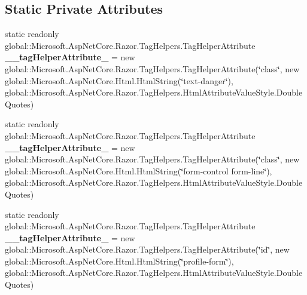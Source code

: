 \subsection*{Static Private Attributes}
\begin{DoxyCompactItemize}
\item 
\mbox{\label{class_projeto_e_s_w_1_1_areas_1_1_identity_1_1_pages_1_1_account_1_1_manage_1_1_areas___identity605f2cac3dc5a4ea38af9197eadd5652_a5b93a0a06bf491e9852274764621c169}} 
static readonly global\+::\+Microsoft.\+Asp\+Net\+Core.\+Razor.\+Tag\+Helpers.\+Tag\+Helper\+Attribute {\bfseries \+\_\+\+\_\+tag\+Helper\+Attribute\+\_} = new global\+::\+Microsoft.\+Asp\+Net\+Core.\+Razor.\+Tag\+Helpers.\+Tag\+Helper\+Attribute(\char`\"{}class\char`\"{}, new global\+::\+Microsoft.\+Asp\+Net\+Core.\+Html.\+Html\+String(\char`\"{}text-\/danger\char`\"{}), global\+::\+Microsoft.\+Asp\+Net\+Core.\+Razor.\+Tag\+Helpers.\+Html\+Attribute\+Value\+Style.\+Double\+Quotes)
\item 
\mbox{\label{class_projeto_e_s_w_1_1_areas_1_1_identity_1_1_pages_1_1_account_1_1_manage_1_1_areas___identity605f2cac3dc5a4ea38af9197eadd5652_a93c439862293b301ab815ac0e3526ec4}} 
static readonly global\+::\+Microsoft.\+Asp\+Net\+Core.\+Razor.\+Tag\+Helpers.\+Tag\+Helper\+Attribute {\bfseries \+\_\+\+\_\+tag\+Helper\+Attribute\+\_} = new global\+::\+Microsoft.\+Asp\+Net\+Core.\+Razor.\+Tag\+Helpers.\+Tag\+Helper\+Attribute(\char`\"{}class\char`\"{}, new global\+::\+Microsoft.\+Asp\+Net\+Core.\+Html.\+Html\+String(\char`\"{}form-\/control form-\/line\char`\"{}), global\+::\+Microsoft.\+Asp\+Net\+Core.\+Razor.\+Tag\+Helpers.\+Html\+Attribute\+Value\+Style.\+Double\+Quotes)
\item 
\mbox{\label{class_projeto_e_s_w_1_1_areas_1_1_identity_1_1_pages_1_1_account_1_1_manage_1_1_areas___identity605f2cac3dc5a4ea38af9197eadd5652_ae67fa2649927fa6636d9fa087b09f7ef}} 
static readonly global\+::\+Microsoft.\+Asp\+Net\+Core.\+Razor.\+Tag\+Helpers.\+Tag\+Helper\+Attribute {\bfseries \+\_\+\+\_\+tag\+Helper\+Attribute\+\_} = new global\+::\+Microsoft.\+Asp\+Net\+Core.\+Razor.\+Tag\+Helpers.\+Tag\+Helper\+Attribute(\char`\"{}id\char`\"{}, new global\+::\+Microsoft.\+Asp\+Net\+Core.\+Html.\+Html\+String(\char`\"{}profile-\/form\char`\"{}), global\+::\+Microsoft.\+Asp\+Net\+Core.\+Razor.\+Tag\+Helpers.\+Html\+Attribute\+Value\+Style.\+Double\+Quotes)

\end{DoxyCompactItemize}
